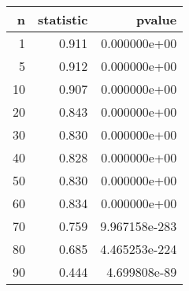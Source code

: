 \begin{tabular}{rrr}
\toprule
  n &  statistic &         pvalue \\
\midrule
  1 &      0.911 &   0.000000e+00 \\
  5 &      0.912 &   0.000000e+00 \\
 10 &      0.907 &   0.000000e+00 \\
 20 &      0.843 &   0.000000e+00 \\
 30 &      0.830 &   0.000000e+00 \\
 40 &      0.828 &   0.000000e+00 \\
 50 &      0.830 &   0.000000e+00 \\
 60 &      0.834 &   0.000000e+00 \\
 70 &      0.759 &  9.967158e-283 \\
 80 &      0.685 &  4.465253e-224 \\
 90 &      0.444 &   4.699808e-89 \\
\bottomrule
\end{tabular}
